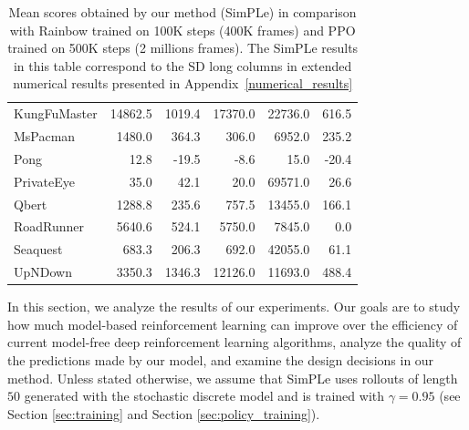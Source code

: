 \begin{table}
\begin{tabular}{l|r|r|r|r|r}
KungFuMaster   &  14862.5 &   1019.4 &  17370.0 &  22736.0 &   616.5 \\
MsPacman       &   1480.0 &    364.3 &    306.0 &   6952.0 &   235.2 \\
Pong           &     12.8 &    -19.5 &     -8.6 &     15.0 &   -20.4 \\
PrivateEye     &     35.0 &     42.1 &     20.0 &  69571.0 &    26.6 \\
Qbert          &   1288.8 &    235.6 &    757.5 &  13455.0 &   166.1 \\
RoadRunner     &   5640.6 &    524.1 &   5750.0 &   7845.0 &     0.0 \\
Seaquest       &    683.3 &    206.3 &    692.0 &  42055.0 &    61.1 \\
UpNDown        &   3350.3 &   1346.3 &  12126.0 &  11693.0 &   488.4 \\

\end{tabular}
\caption{Mean scores obtained by our method (SimPLe) in comparison with Rainbow trained on 100K steps (400K frames) and PPO trained on 500K steps (2 millions frames). The SimPLe results in this table correspond to the SD long columns in extended numerical results presented in Appendix~\ref{numerical_results}}
\label{tab:shortNumericalResults}
\end{table}

In this section, we analyze the results of our experiments. Our goals are to study how much model-based reinforcement learning can improve over the efficiency of current model-free deep reinforcement learning algorithms, analyze the quality of the predictions made by our model, and examine the design decisions in our method. Unless stated otherwise, we assume that SimPLe uses rollouts of length $50$ generated with the stochastic discrete model and is trained with $\gamma=0.95$ (see Section \ref{sec:training} and Section \ref{sec:policy_training}). 

